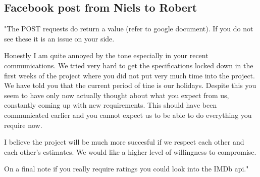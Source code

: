 \subsection{Facebook post from Niels to Robert}
\label{app:enough}
"The POST requests do return a value (refer to google document). If you do not
see these it is an issue on your side.

Honestly I am quite annoyed by the tone especially in your recent
communications. We tried very hard to get the specifications locked down in the
first weeks of the project where you did not put very much time into the
project. We have told you that the current period of tine is our holidays.
Despite this you seem to have only now actually thought about what you expect
from us, constantly coming up with new requirements. This should have been
communicated earlier and you cannot expect us to be able to do everything you
require now.

I believe the project will be much more succesful if we respect each other and
each other's estimates. We would like a higher level of willingness to
compromise.

On a final note if you really require ratings you could look into the IMDb api."
